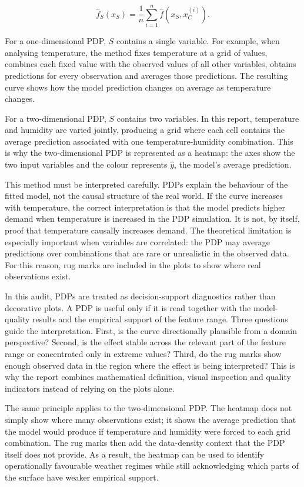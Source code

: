 \documentclass[
]{article}
\begin{document}
\[
\hat{f}_{S}(x_S)=\frac{1}{n}\sum_{i=1}^{n}\hat{f}(x_S,x^{(i)}_{C}).
\]

For a one-dimensional PDP, $S$ contains a single variable. For example, when analysing temperature, the method fixes temperature at a grid of values, combines each fixed value with the observed values of all other variables, obtains predictions for every observation and averages those predictions. The resulting curve shows how the model prediction changes on average as temperature changes.

For a two-dimensional PDP, $S$ contains two variables. In this report, temperature and humidity are varied jointly, producing a grid where each cell contains the average prediction associated with one temperature-humidity combination. This is why the two-dimensional PDP is represented as a heatmap: the axes show the two input variables and the colour represents $\hat{y}$, the model's average prediction.

This method must be interpreted carefully. PDPs explain the behaviour of the fitted model, not the causal structure of the real world. If the curve increases with temperature, the correct interpretation is that the model predicts higher demand when temperature is increased in the PDP simulation. It is not, by itself, proof that temperature causally increases demand. The theoretical limitation is especially important when variables are correlated: the PDP may average predictions over combinations that are rare or unrealistic in the observed data. For this reason, rug marks are included in the plots to show where real observations exist.

In this audit, PDPs are treated as decision-support diagnostics rather than decorative plots. A PDP is useful only if it is read together with the model-quality results and the empirical support of the feature range. Three questions guide the interpretation. First, is the curve directionally plausible from a domain perspective? Second, is the effect stable across the relevant part of the feature range or concentrated only in extreme values? Third, do the rug marks show enough observed data in the region where the effect is being interpreted? This is why the report combines mathematical definition, visual inspection and quality indicators instead of relying on the plots alone.

The same principle applies to the two-dimensional PDP. The heatmap does not simply show where many observations exist; it shows the average prediction that the model would produce if temperature and humidity were forced to each grid combination. The rug marks then add the data-density context that the PDP itself does not provide. As a result, the heatmap can be used to identify operationally favourable weather regimes while still acknowledging which parts of the surface have weaker empirical support.
\end{document}

